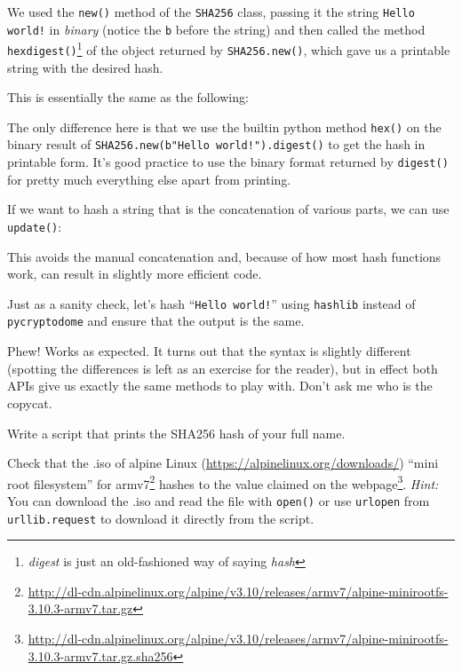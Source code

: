 \documentclass[a4paper,11pt]{article}
\begin{document}
    We used the \texttt{new()} method of the \texttt{SHA256} class, passing it
    the string \texttt{Hello world!} in \textit{binary} (notice the \texttt{b}
    before the string) and then called the method
    \texttt{hexdigest()}\footnote{\textit{digest} is just an old-fashioned way
    of saying \textit{hash}} of the object returned by \texttt{SHA256.new()},
    which gave us a printable string with the desired hash.

    This is essentially the same as the following:

    \codelisting{\helloshahex}
    \outputlisting{\helloshahex}
    The only difference here is that we use the builtin python method
    \texttt{hex()} on the binary result of \texttt{SHA256.new(b"Hello
    world!").digest()} to get the hash in printable form. It's good practice to
    use the binary format returned by \texttt{digest()} for pretty much
    everything else apart from printing.

    If we want to hash a string that is the concatenation of various parts, we
    can use \texttt{update()}:

    \codelisting{\helloshaupdate}
    \outputlisting{\helloshaupdate}
    This avoids the manual concatenation and, because of how most hash functions
    work, can result in slightly more efficient code.

    Just as a sanity check, let's hash ``\texttt{Hello world!}'' using
    \texttt{hashlib} instead of \texttt{pycryptodome} and ensure that the output
    is the same.

    \codelisting{\helloshahashlib}
    \outputlisting{\helloshahashlib}
    Phew! Works as expected. It turns out that the syntax is slightly different
    (spotting the differences is left as an exercise for the reader), but in
    effect both APIs give us exactly the same methods to play with. Don't ask me
    who is the copycat.

    \begin{exercise}
      \label{ex:hash:name}
      Write a script that prints the SHA256 hash of your full name.
    \end{exercise}


    \begin{exercise}
      \label{ex:hash:sourcecode}
      Check that the .iso of alpine Linux
      (\url{https://alpinelinux.org/downloads/}) ``mini root filesystem'' for
      armv7\footnote{\url{http://dl-cdn.alpinelinux.org/alpine/v3.10/releases/armv7/alpine-minirootfs-3.10.3-armv7.tar.gz}}
      hashes to the value claimed on the
      webpage\footnote{\url{http://dl-cdn.alpinelinux.org/alpine/v3.10/releases/armv7/alpine-minirootfs-3.10.3-armv7.tar.gz.sha256}}.
      \emph{Hint:} You can download the .iso and read the file with
      \texttt{open()} or use \texttt{urlopen} from \texttt{urllib.request} to
      download it directly from the script.
    \end{exercise}
\end{document}
